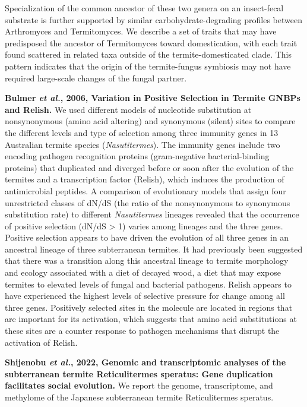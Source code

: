 \documentclass[11pt]{article}
\begin{document}
\begin{sloppypar}
Specialization of the common ancestor of these two genera on an insect-fecal substrate is further supported by similar carbohydrate-degrading profiles between Arthromyces and Termitomyces. 
We describe a set of traits that may have predisposed the ancestor of Termitomyces toward domestication, with each trait found scattered in related taxa outside of the termite-domesticated clade. 
This pattern indicates that the origin of the termite-fungus symbiosis may not have required large-scale changes of the fungal partner.
\par
\textbf{Bulmer \textit{et al.}, 2006, Variation in Positive Selection in Termite GNBPs and Relish.} \newline
We used different models of nucleotide substitution at nonsynonymous (amino acid altering) and synonymous (silent) sites to compare the different levels and type of selection among three immunity genes in 13 Australian termite species (\textit{Nasutitermes}). 
The immunity genes include two encoding pathogen recognition proteins (gram-negative bacterial-binding proteins) that duplicated and diverged before or soon after the evolution of the termites and a transcription factor (Relish), which induces the production of antimicrobial peptides. 
A comparison of evolutionary models that assign four unrestricted classes of dN/dS (the ratio of the nonsynonymous to synonymous substitution rate) to different \textit{Nasutitermes} lineages revealed that the occurrence of positive selection (dN/dS > 1) varies among lineages and the three genes. 
Positive selection appears to have driven the evolution of all three genes in an ancestral lineage of three subterranean termites. 
It had previously been suggested that there was a transition along this ancestral lineage to termite morphology and ecology associated with a diet of decayed wood, a diet that may expose termites to elevated levels of fungal and bacterial pathogens. 
Relish appears to have experienced the highest levels of selective pressure for change among all three genes. 
Positively selected sites in the molecule are located in regions that are important for its activation, which suggests that amino acid substitutions at these sites are a counter response to pathogen mechanisms that disrupt the activation of Relish.
\par
\textbf{Shijenobu \textit{et al.}, 2022, Genomic and transcriptomic analyses of the subterranean termite Reticulitermes speratus: Gene duplication facilitates social evolution.} \newline
We report the genome, transcriptome, and methylome of the Japanese subterranean termite Reticulitermes speratus. 

\end{sloppypar}
\end{document}
